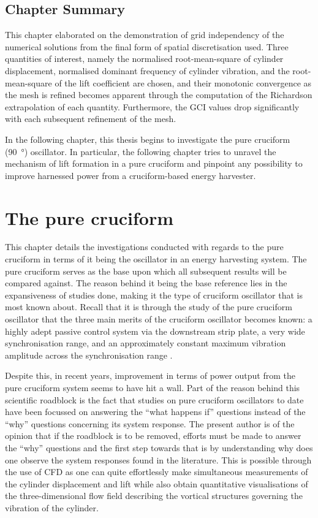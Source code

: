 \documentclass[oneside]{utmthesis}
\begin{document}
\section{Chapter Summary} \label{sec:chapSumValid}
This chapter elaborated on the demonstration of grid independency of the numerical solutions from the final form of spatial discretisation used. Three quantities of interest, namely the normalised root-mean-square of cylinder displacement, normalised dominant frequency of cylinder vibration, and the root-mean-square of the lift coefficient are chosen, and their monotonic convergence as the mesh is refined becomes apparent through the computation of the Richardson extrapolation of each quantity. Furthermore, the GCI values drop significantly with each subsequent refinement of the mesh.

In the following chapter, this thesis begins to investigate the pure cruciform (\SI{90}{\degree}) oscillator. In particular, the following chapter tries to unravel the mechanism of lift formation in a pure cruciform and pinpoint any possibility to improve harnessed power from a cruciform-based energy harvester.

\chapter{The pure cruciform}\label{chap:svivRegime}
This chapter details the investigations conducted with regards to the pure cruciform in terms of it being the oscillator in an energy harvesting system. The pure cruciform serves as the base upon which all subsequent results will be compared against. The reason behind it being the base reference lies in the expansiveness of studies done, making it the type of cruciform oscillator that is most known about. Recall that it is through the study of the pure cruciform oscillator that the three main merits of the cruciform oscillator becomes known: a highly adept passive control system via the downstream strip plate, a very wide synchronisation range, and an approximately constant maximum vibration amplitude across the synchronisation range \citep{Koide2013}.

Despite this, in recent years, improvement in terms of power output from the pure cruciform system seems to have hit a wall. Part of the reason behind this scientific roadblock is the fact that studies on pure cruciform oscillators to date have been focussed on answering the ``what happens if'' questions instead of the ``why'' questions concerning its system response. The present author is of the opinion that if the roadblock is to be removed, efforts must be made to answer the ``why'' questions and the first step towards that is by understanding why does one observe the system responses found in the literature. This is possible through the use of CFD as one can quite effortlessly make simultaneous measurements of the cylinder displacement and lift while also obtain quantitative visualisations of the three-dimensional flow field describing the vortical structures governing the vibration of the cylinder.
\end{document}
